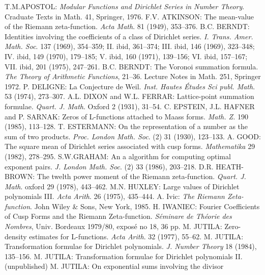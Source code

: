 \begin{thebibliography}{99}
 T.M.\pageoriginale APOSTOL: \emph{Modular Functions and
  Dirichlet Series in Number Theory}. Craduate Texts in Math. 41,
  Springer, 1976. 
 F.V. ATKINSON: The mean-value of the Riemann
  zeta-function. \emph{Acta Math}. 81 (1949), 353--376. 
 B.C. BERNDT: Identities involving the coefficients of a
  class of Dirichlet series. \emph{I. Trans. Amer. Math. Soc}. 137
  (1969), 354--359; II. ibid, 361--374; III. ibid, 146 (1969),
  323--348; IV. ibid, 149 (1970), 179--185; V. ibid, 160 (1971),
  139--156; VI. ibid, 157--167; VII. ibid, 201 (1975), 247--261. 
 B.C. BERNDT: The Voronoi summation formula. \emph{The
  Theory of Arithmetic Functions}, 21--36. Lecture Notes in Math. 251,
  Springer 1972. 
 P. DELIGNE: La Conjecture de Weil. \emph{Inst. Hautes
  \'Etudes Sci publ. Math}. 53 (1974), 273--307. 
 A.L. DIXON and W.L. FERRAR: Lattice-point summation
  formulae. \emph{Quart. J. Math}. Oxford 2 (1931), 31--54. 
 C. EPSTEIN, J.L. HAFNER and P. SARNAK: Zeros of
  L-functions attached to Maass forms. \emph{Math. Z.} 190 (1985),
  113--128. 
 T. ESTERMANN: On the representation of a number as the
  sum of two products. \emph{Proc. London Math. Soc}. (2) 31 (1930),
  123--133. 
 A. GOOD: The square mean of Dirichlet series associated
  with cusp forms. \emph{Mathematika} 29 (1982), 278--295. 
 S.W.\pageoriginale GRAHAM: An a algorithm for
  computing optimal exponent pairs. \emph{J. London Math. Soc}. (2) 33
  (1986), 203--218. 
 D.R. HEATH-BROWN: The twelth power moment of the
  Riemann zeta-function. \emph{Quart. J. Math}. oxford 29 (1978),
  443--462. 
 M.N. HUXLEY: Large values of Dirichlet polynomials
  III. \emph{Acta Arith}. 26 (1975), 435--444. 
 A. Ivic: \emph{The Riemann Zeta-function}. John Wiley
  \& Sons, New York, 1985. 
 H. IWANIEC: Fourier Coefficients of Cusp Forms and the
  Riemann Zeta-function. \emph{S\'eminare de Th\'eorie des Nombres},
  Univ. Bordeaux 1979/80, expos\'e no 18, 36 pp. 
 M. JUTILA: Zero-density estimates for
  L-functions. \emph{Acta Arith}. 32 (1977), 55--62. 
 M. JUTILA: Transformation formulae for Dirichlet
  polynomials. \emph{J. Number Theory} 18 (1984), 135--156. 
 M. JUTILA: Transformation formulae for Dirichlet
  polynomials II. (unpublished) 
 M. JUTILA: On exponential sums involving the divisor

\end{thebibliography}
